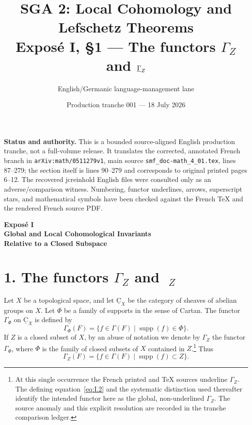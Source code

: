 \documentclass[11pt]{article}
\title{\textbf{SGA 2: Local Cohomology and Lefschetz Theorems}\\[0.5em]
  \large Expos\'e I, \S1 --- The functors $\Gamma_Z$ and $\uGamma_Z$}
\author{English/Germanic language-management lane}
\date{Production tranche 001 --- 18 July 2026}
\newcommand{\uGamma}{\mathop{\underline{\Gamma}}\nolimits}
\newcommand{\uC}{\underline{\mathrm{C}}}
\newcommand{\srcpage}[1]{%
  \marginpar{\raggedright\scriptsize\color{rulegray}French printed p.~#1}}
\begin{document}
\maketitle

\noindent\colorbox{statusgray}{%
  \parbox{\dimexpr\linewidth-2\fboxsep\relax}{\small
  \textbf{Status and authority.} This is a bounded source-aligned English
  production tranche, not a full-volume release.  It translates the corrected,
  annotated French branch in \texttt{arXiv:math/0511279v1}, main source
  \texttt{smf\_doc-math\_4\_01.tex}, lines 87--279; the section itself is lines
  90--279 and corresponds to original printed pages 6--12.  The recovered
  jcreinhold English files were consulted only as an adverse/comparison witness.
  Numbering, functor underlines, arrows, superscript stars, and mathematical
  symbols have been checked against the French TeX and the rendered French
  source PDF.}}

\vspace{1.5em}

\begin{center}
  \Large\bfseries Expos\'e I\\[0.6em]
  \large Global and Local Cohomological Invariants\\
  Relative to a Closed Subspace
\end{center}

\section*{1. The functors $\Gamma_Z$ and $\uGamma_Z$}

\srcpage{6}
Let $X$ be a topological space, and let $\uC_X$ be the category of
sheaves of abelian groups on $X$.  Let $\Phi$ be a family of supports in
the sense of Cartan.  The functor $\Gamma_\Phi$ on $\uC_X$ is defined by
\begin{equation}
  \Gamma_\Phi(F)
  =\{f\in\Gamma(F)\mid \operatorname{supp}(f)\in\Phi\}.
  \tag{1}\label{eq:I.1}
\end{equation}
If $Z$ is a closed subset of $X$, by an abuse of notation we denote by
$\Gamma_Z$ the functor $\Gamma_\Phi$, where $\Phi$ is the family of
closed subsets of $X$ contained in $Z$.\footnote{At this single occurrence
the French printed and TeX sources underline $\Gamma_Z$.  The defining
equation~\eqref{eq:I.2} and the systematic distinction used thereafter
identify the intended functor here as the global, non-underlined $\Gamma_Z$.
The source anomaly and this explicit resolution are recorded in the tranche
comparison ledger.}
Thus
\begin{equation}
  \Gamma_Z(F)
  =\{f\in\Gamma(F)\mid \operatorname{supp}(f)\subset Z\}.
  \tag{2}\label{eq:I.2}
\end{equation}
\end{document}
